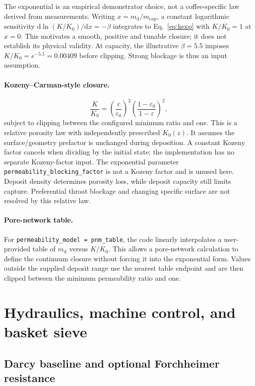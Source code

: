 \documentclass[11pt,a4paper]{article}
\newcommand{\code}[1]{\texttt{#1}}
\begin{document}
The exponential is an empirical demonstrator choice, not a coffee-specific
law derived from measurements. Writing $x=m_{\mathrm d}/m_{\mathrm{cap}}$, a
constant logarithmic sensitivity $\mathrm d\ln(K/K_0)/\mathrm dx=-\beta$
integrates to Eq.~\eqref{eq:kexp} with $K/K_0=1$ at $x=0$. This motivates a
smooth, positive and tunable closure; it does not establish its physical validity.
At capacity, the illustrative $\beta=5.5$ imposes $K/K_0=e^{-5.5}=0.00409$
before clipping. Strong blockage is thus an input assumption.

\paragraph{Kozeny--Carman-style closure.}
\begin{equation}
\frac{K}{K_0}=
\left(\frac{\varepsilon}{\varepsilon_0}\right)^3
\left(\frac{1-\varepsilon_0}{1-\varepsilon}\right)^2,
\end{equation}
subject to clipping between the configured minimum ratio and one. This is a
relative porosity law with independently prescribed $K_0(z)$. It assumes the
surface/geometry prefactor is unchanged during deposition. A constant Kozeny
factor cancels when dividing by the initial state; the implementation has no
separate Kozeny-factor input. The exponential parameter
\code{permeability\_blocking\_factor} is not a Kozeny factor and is unused here.
Deposit density determines porosity loss, while deposit capacity still limits
capture. Preferential throat blockage and changing specific surface are not
resolved by this relative law.

\paragraph{Pore-network table.}
For 
\code{permeability\_model = pnm\_table}, the code linearly interpolates a
user-provided table of $m_{\mathrm d}$ versus $K/K_0$. This allows a pore-network
calculation to define the continuum closure without forcing it into the
exponential form. Values outside the supplied deposit range use the nearest
table endpoint and are then clipped between the minimum permeability ratio and one.

\section{Hydraulics, machine control, and basket sieve}

\subsection{Darcy baseline and optional Forchheimer resistance}
\end{document}
